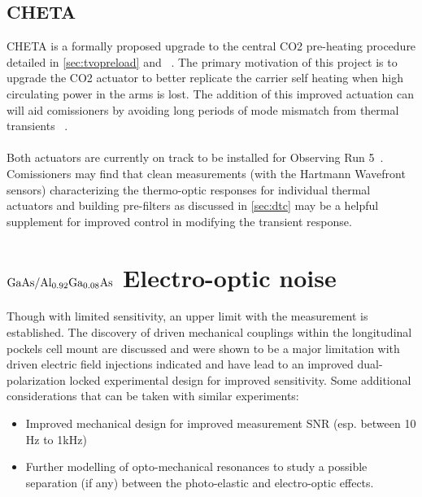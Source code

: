 \subsection*{CHETA}
CHETA is a formally proposed upgrade to the central CO2 pre-heating procedure detailed in \autoref{sec:tvopreload} and ~\cite{Hamedan:2018}. The primary motivation of this project is to upgrade the CO2 actuator to better replicate the carrier self heating when high circulating power in the arms is lost. The addition of this improved actuation can will aid comissioners by avoiding long periods of mode mismatch from thermal transients ~\cite{cheta}. 
\\
\\
Both actuators are currently on track to be installed for Observing Run 5~\cite{O5tcssummary}. Comissioners may find that clean measurements (with the Hartmann Wavefront sensors) characterizing the thermo-optic responses for individual thermal actuators and building pre-filters as discussed in \autoref{sec:dtc} may be a helpful supplement for improved control in modifying the transient response.

\section{\texorpdfstring{$\mathrm{GaAs} / \mathrm{Al_{0.92}Ga_{0.08}As}$}{gaas/algaas} Electro-optic noise}
Though with limited sensitivity, an upper limit with the measurement is established. The discovery of driven mechanical couplings within the longitudinal pockels cell mount are discussed and were shown to be a major limitation with driven electric field injections indicated and have lead to an improved dual-polarization locked experimental design for improved sensitivity. Some additional considerations that can be taken with similar experiments:

\begin{itemize}
	\item Improved mechanical design for improved measurement SNR (esp. between 10 Hz to 1kHz)
	\item Further modelling of opto-mechanical resonances to study a possible separation (if any) between the photo-elastic and electro-optic effects.  
\end{itemize}
